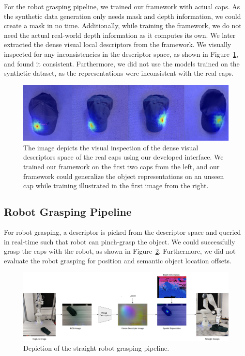 For the robot grasping pipeline, we trained our framework with actual caps.
As the synthetic data generation only needs mask and depth information, we could create a mask in no time.
Additionally, while training the framework, we do not need the actual real-world depth information as it computes its own.
We later extracted the dense visual local descriptors from the framework.
We visually inspected for any inconsistencies in the descriptor space, as shown in Figure~\ref{fig:check_real_caps},
and found it consistent. Furthermore, we did not use the models trained on the synthetic dataset, as the representations were inconsistent with the real caps.

\begin{figure}[htb]
    \centering
    \includegraphics[scale=0.2]{images/test_real_caps.png}
    \caption{The image depicts the visual inspection of the dense visual descriptors space of the real caps using our developed interface. We trained our framework on the first two caps from the left, and our framework could generalize the object representations on an unseen cap while training illustrated in the first image from the right.}
    \label{fig:check_real_caps}
\end{figure}



\subsection{Robot Grasping Pipeline}

For robot grasping, a descriptor is picked from the descriptor space and queried in real-time such that robot can pinch-grasp the object.
We could successfully grasp the caps with the robot, as shown in Figure~\ref{fig:straight_grasp}.
Furthermore, we did not evaluate the robot grasping for position and semantic object location offsets.

\begin{figure}[htb]
    \centering
    \includegraphics[scale=0.15]{images/straight_grasps.png}
    \caption{Depiction of the straight robot grasping pipeline.}
    \label{fig:straight_grasp}
\end{figure}

